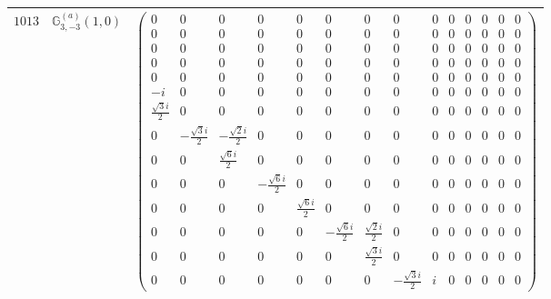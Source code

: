 \documentclass[fleqn,8pt,landscape]{jsarticle}
\begin{document}
\begin{center}
\begin{longtable}{ccc}
$ 1013 $ & $ \mathbb{G}_{3,-3}^{(a)}(1,0) $ & $ \begin{pmatrix} 0 & 0 & 0 & 0 & 0 & 0 & 0 & 0 & 0 & 0 & 0 & 0 & 0 & 0 \\ 0 & 0 & 0 & 0 & 0 & 0 & 0 & 0 & 0 & 0 & 0 & 0 & 0 & 0 \\ 0 & 0 & 0 & 0 & 0 & 0 & 0 & 0 & 0 & 0 & 0 & 0 & 0 & 0 \\ 0 & 0 & 0 & 0 & 0 & 0 & 0 & 0 & 0 & 0 & 0 & 0 & 0 & 0 \\ 0 & 0 & 0 & 0 & 0 & 0 & 0 & 0 & 0 & 0 & 0 & 0 & 0 & 0 \\ - i & 0 & 0 & 0 & 0 & 0 & 0 & 0 & 0 & 0 & 0 & 0 & 0 & 0 \\ \frac{\sqrt{3} i}{2} & 0 & 0 & 0 & 0 & 0 & 0 & 0 & 0 & 0 & 0 & 0 & 0 & 0 \\ 0 & - \frac{\sqrt{3} i}{2} & - \frac{\sqrt{2} i}{2} & 0 & 0 & 0 & 0 & 0 & 0 & 0 & 0 & 0 & 0 & 0 \\ 0 & 0 & \frac{\sqrt{6} i}{2} & 0 & 0 & 0 & 0 & 0 & 0 & 0 & 0 & 0 & 0 & 0 \\ 0 & 0 & 0 & - \frac{\sqrt{6} i}{2} & 0 & 0 & 0 & 0 & 0 & 0 & 0 & 0 & 0 & 0 \\ 0 & 0 & 0 & 0 & \frac{\sqrt{6} i}{2} & 0 & 0 & 0 & 0 & 0 & 0 & 0 & 0 & 0 \\ 0 & 0 & 0 & 0 & 0 & - \frac{\sqrt{6} i}{2} & \frac{\sqrt{2} i}{2} & 0 & 0 & 0 & 0 & 0 & 0 & 0 \\ 0 & 0 & 0 & 0 & 0 & 0 & \frac{\sqrt{3} i}{2} & 0 & 0 & 0 & 0 & 0 & 0 & 0 \\ 0 & 0 & 0 & 0 & 0 & 0 & 0 & - \frac{\sqrt{3} i}{2} & i & 0 & 0 & 0 & 0 & 0 \end{pmatrix} $ \\ \hline

\end{longtable}
\end{center}
\end{document}
